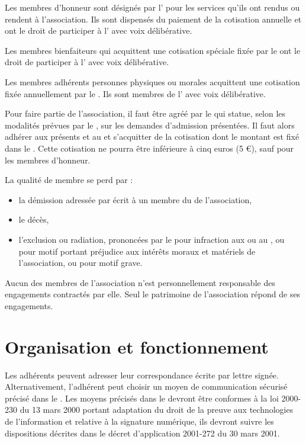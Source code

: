 Les membres d'honneur sont désignés par l'\AG{} pour les
services qu'ils ont rendus ou rendent à l'association. Ils sont
dispensés du paiement de la cotisation annuelle et ont le droit de
participer à l'\AG{} avec voix délibérative.

Les membres bienfaiteurs qui acquittent une cotisation spéciale fixée
par le \RI{} ont le droit de participer à l'\AG{} avec voix délibérative.

Les membres adhérents personnes physiques ou morales acquittent une
cotisation fixée annuellement par le \RI{}. Ils sont
membres de l'\AG{} avec voix délibérative.

\label{sec:admission}

Pour faire partie de l'association, il faut être agréé par le
\bureau{} qui statue, selon les modalités prévues par le \RI{}, sur
les demandes d'admission présentées. Il faut alors adhérer aux
présents \statuts{} et au \RI{} et s'acquitter de la cotisation dont
le montant est fixé dans le \RI{}. Cette cotisation ne pourra être inférieure à cinq euros (5 \euro{}), sauf pour les membres d'honneur.

\label{sec:perte}
La qualité de membre se perd par :
\begin{itemize}
\item la démission adressée par écrit à un membre du \bureau{} de l'association,

\item le décès,

\item l'exclusion ou radiation, prononcées par le \bureau{} pour infraction
aux \statuts{} ou au \RI{}, ou pour motif portant préjudice
aux intérêts moraux et matériels de l'association, ou pour motif
grave.
\end{itemize}


\label{sec:responsabilite}
Aucun des membres de l'association n'est personnellement responsable
des engagements contractés par elle. Seul le patrimoine de
l'association répond de ses engagements.


\section{Organisation et fonctionnement}

\label{sec:moyen-de-corresp}
Les adhérents peuvent adresser leur correspondance écrite par lettre signée. Alternativement, l'adhérent peut choisir un moyen de communication sécurisé précisé dans le \RI{}. Les moyens précisés dans le \RI{} devront être conformes à la loi 2000-230 du 13 mars 2000 portant adaptation du droit de la preuve aux technologies de l'information et relative à la signature numérique, ils devront suivre les dispositions décrites dans le décret d'application 2001-272 du 30 mars 2001. 

